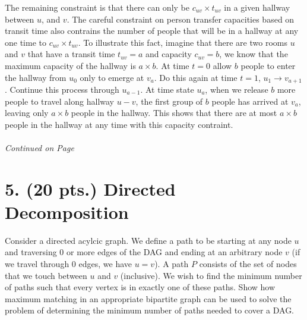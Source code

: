 \documentclass[11pt]{article}
\begin{document}
The remaining constraint is that there can only be $c_{uv}\times t_{uv}$ in a given
hallway between $u$, and $v$. The careful constraint on person transfer capacities 
based on transit time also contrains the number of people that will be in a hallway
at any one time to $c_{uv}\times t_{uv}$. To illustrate this fact, imagine that 
there are two rooms $u$ and $v$ that have a transit time $t_{uv}=a$ and capacity 
$c_{uv}=b$, we know that the maximum capacity of the hallway is $a\times b$.
At time $t=0$ allow $b$ people to enter the hallway from $u_0$ only to emerge
at $v_a$. Do this again at time $t=1$, $u_1\rightarrow v_{a+1}$. 
Continue this process through $u_{a-1}$. At time state $u_a$, when we release
$b$ more people to travel along hallway $u - v$, the first group of $b$ people has
arrived at $v_a$, leaving only $a\times b$ people in the hallway. 
This shows that there are at most $a\times b$ people in the hallway at any time
with this capacity contraint.



\label{pg:end-of-p4}

%
\paragraph{} \emph{Continued on Page \pageref{pg:p4-continuation}}

\newpage

\section*{5. (20 pts.) Directed Decomposition}

Consider a directed acylcic graph. We define a path to be starting at any 
node $u$ and traversing $0$ or more edges of the DAG and ending at an arbitrary 
node $v$ (if we travel through $0$ edges, we have $u = v$). A path $P$ 
consists of the set of nodes that we touch between $u$ and $v$ (inclusive). 
We wish to find the minimum number of paths such that every vertex is in 
exactly one of these paths. Show how maximum matching in an appropriate 
bipartite graph can be used to solve the problem of determining the 
minimum number of paths needed to cover a DAG.
\end{document}
